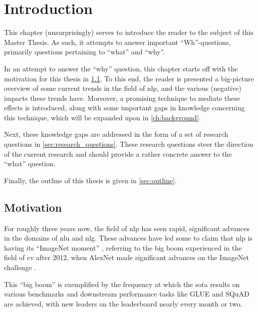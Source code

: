 \chapter{Introduction}
\label{ch:introduction}
This chapter (unsurprisingly) serves to introduce the reader to the subject of this Master Thesis. As such, it attempts to answer important ``Wh''-questions, primarily questions pertaining to ``what'' and ``why''. 

In an attempt to answer the ``why'' question, this chapter starts off with the motivation for this thesis in \cref{sec:motivation}. To this end, the reader is presented a big-picture overview of some current trends in the field of \gls{nlp}, and the various (negative) impacts these trends have. Moreover, a promising technique to mediate these effects is introduced, along with some important gaps in knowledge concerning this technique, which will be expanded upon in \cref{ch:background}.

Next, these knowledge gaps are addressed in the form of a set of research questions in \cref{sec:research_questions}. These research questions steer the direction of the current research and should provide a rather concrete answer to the ``what'' question.

Finally, the outline of this thesis is given in \cref{sec:outline}.



\section{Motivation}
\label{sec:motivation}
For roughly three years now, the field of \gls{nlp} has seen rapid, significant advances in the domains of \gls{nlu} and \gls{nlg}. These advances have led some to claim that \gls{nlp} is having its ``ImageNet moment'' \citep{ruder2018}, referring to the big boom experienced in the field of \gls{cv} after 2012, when AlexNet \citep{krizhevsky2012imagenet} made significant advances on the ImageNet challenge \citep{russakovsky2015imagenet}. 

This ``big boom'' is exemplified by the frequency at which the \gls{sota} results on various benchmarks and downstream performance tasks like GLUE \citep{wang2018glue} and SQuAD \citep{rajpurkar2016squad,rajpurkar2018know} are achieved, with new leaders on the leaderboard nearly every month or two.

